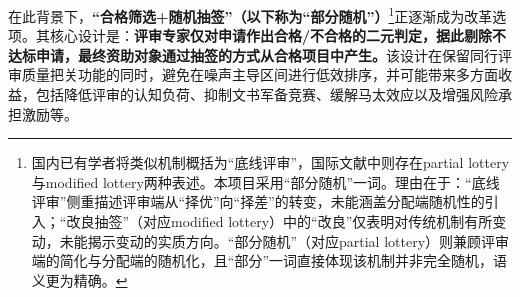 

在此背景下，\textbf{“合格筛选+随机抽签”（以下称为“部分随机”）}\footnote{国内已有学者将类似机制概括为“底线评审”\citep{BaochenzhouHRC2023, liu2021peerreview}，国际文献中则存在partial lottery与modified lottery两种表述。本项目采用“部分随机”一词。理由在于：“底线评审”侧重描述评审端从“择优”向“择差”的转变，未能涵盖分配端随机性的引入；“改良抽签”（对应modified lottery）中的“改良”仅表明对传统机制有所变动，未能揭示变动的实质方向。“部分随机”（对应partial lottery）则兼顾评审端的简化与分配端的随机化，且“部分”一词直接体现该机制并非完全随机，语义更为精确。}正逐渐成为改革选项。其核心设计是：\textbf{评审专家仅对申请作出合格/不合格的二元判定，据此剔除不达标申请，最终资助对象通过抽签的方式从合格项目中产生。}该设计在保留同行评审质量把关功能的同时，避免在噪声主导区间进行低效排序，并可能带来多方面收益，包括降低评审的认知负荷、抑制文书军备竞赛、缓解马太效应以及增强风险承担激励等。


